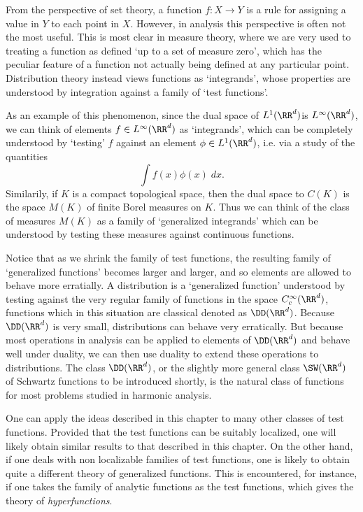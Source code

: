 From the perspective of set theory, a function $f: X \to Y$ is a rule for assigning a value in $Y$ to each point in $X$. However, in analysis this perspective is often not the most useful. This is most clear in measure theory, where we are very used to treating a function as defined `up to a set of measure zero', which has the peculiar feature of a function not actually being defined at any particular point. Distribution theory instead views functions as `integrands', whose properties are understood by integration against a family of `test functions'.

As an example of this phenomenon, since the dual space of $L^1(\RR^d)$is $L^\infty(\RR^d)$, we can think of elements $f \in L^\infty(\RR^d)$ as `integrands', which can be completely understood by `testing' $f$ against an element $\phi \in L^1(\RR^d)$, i.e. via a study of the quantities
%
\[ \int f(x) \phi(x)\; dx. \]
%
Similarily, if $K$ is a compact topological space, then the dual space to $C(K)$ is the space $M(K)$ of finite Borel measures on $K$. Thus we can think of the class of measures $M(K)$ as a family of `generalized integrands' which can be understood by testing these measures against continuous functions.

Notice that as we shrink the family of test functions, the resulting family of `generalized functions' becomes larger and larger, and so elements are allowed to behave more erratially. A distribution is a `generalized function' understood by testing against the very regular family of functions in the space $C_c^\infty(\RR^d)$, functions which in this situation are classical denoted as $\DD(\RR^d)$. Because $\DD(\RR^d)$ is very small, distributions can behave very erratically. But because most operations in analysis can be applied to elements of $\DD(\RR^d)$ and behave well under duality, we can then use duality to extend these operations to distributions. The class $\DD(\RR^d)$, or the slightly more general class $\SW(\RR^d)$ of Schwartz functions to be introduced shortly, is the natural class of functions for most problems studied in harmonic analysis. 

One can apply the ideas described in this chapter to many other classes of test functions. Provided that the test functions can be suitably localized, one will likely obtain similar results to that described in this chapter. On the other hand, if one deals with non localizable families of test functions, one is likely to obtain quite a different theory of generalized functions. This is encountered, for instance, if one takes the family of analytic functions as the test functions, which gives the theory of \emph{hyperfunctions}.

